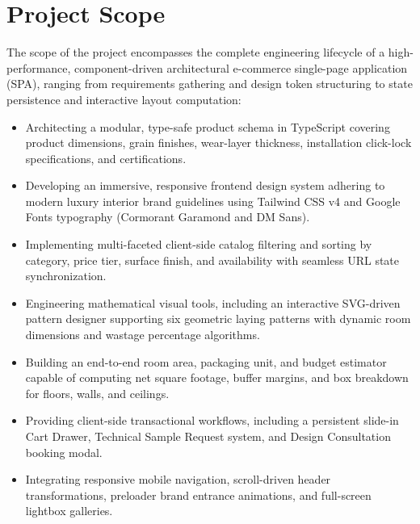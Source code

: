 \documentclass[12pt,a4paper]{report}
\begin{document}
\section{Project Scope}
The scope of the project encompasses the complete engineering lifecycle of a high-performance, component-driven architectural e-commerce single-page application (SPA), ranging from requirements gathering and design token structuring to state persistence and interactive layout computation:
\begin{itemize}
    \item Architecting a modular, type-safe product schema in TypeScript covering product dimensions, grain finishes, wear-layer thickness, installation click-lock specifications, and certifications.
    \item Developing an immersive, responsive frontend design system adhering to modern luxury interior brand guidelines using Tailwind CSS v4 and Google Fonts typography (Cormorant Garamond and DM Sans).
    \item Implementing multi-faceted client-side catalog filtering and sorting by category, price tier, surface finish, and availability with seamless URL state synchronization.
    \item Engineering mathematical visual tools, including an interactive SVG-driven pattern designer supporting six geometric laying patterns with dynamic room dimensions and wastage percentage algorithms.
    \item Building an end-to-end room area, packaging unit, and budget estimator capable of computing net square footage, buffer margins, and box breakdown for floors, walls, and ceilings.
    \item Providing client-side transactional workflows, including a persistent slide-in Cart Drawer, Technical Sample Request system, and Design Consultation booking modal.
    \item Integrating responsive mobile navigation, scroll-driven header transformations, preloader brand entrance animations, and full-screen lightbox galleries.
\end{itemize}
\end{document}
